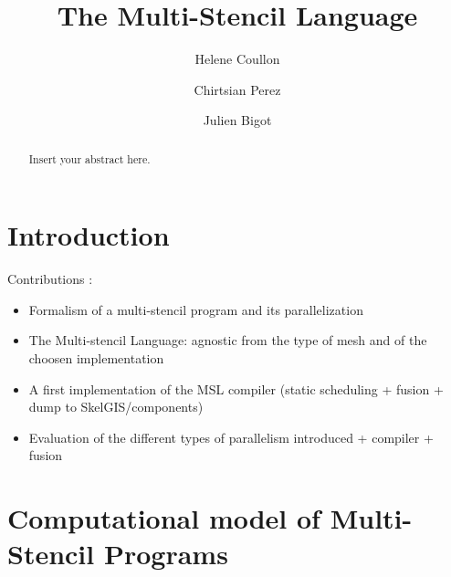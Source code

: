 \documentclass[twocolumn]{svjour3}          %
\begin{document}
\title{The Multi-Stencil Language}


\author{Helene Coullon         \and
        Chirtsian Perez \and
        Julien Bigot
}





\maketitle

\begin{abstract}
Insert your abstract here.
\end{abstract}

\section{Introduction}
\label{sect:introduction}
Contributions :
\begin{itemize}
\item Formalism of a multi-stencil program and its parallelization
\item The Multi-stencil Language: agnostic from the type of mesh and of the choosen implementation
\item A first implementation of the MSL compiler (static scheduling + fusion + dump to SkelGIS/components)
\item Evaluation of the different types of parallelism introduced + compiler + fusion
\end{itemize}
\section{Computational model of Multi-Stencil Programs}
\label{sect:formalism}

\end{document}
